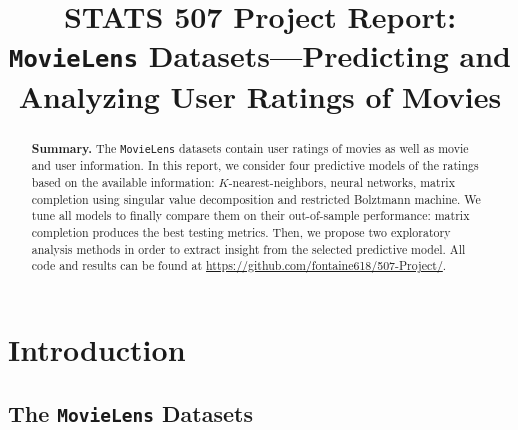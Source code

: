 \documentclass[bj, preprint]{imsart}
\begin{document}
\begin{frontmatter}

\title{{\Large STATS 507 Project Report:} \\ 
\bf \texttt{MovieLens} Datasets---Predicting and Analyzing User Ratings of Movies}


\vspace{2cm}

\begin{abstract}
\textbf{Summary.} The \texttt{MovieLens} datasets contain user ratings of movies as well as movie and user information. In this report, we consider four predictive models of the ratings based on the available information: $K$-nearest-neighbors, neural networks, matrix completion using singular value decomposition and  restricted Bolztmann machine. We tune all models to finally compare them on their out-of-sample performance: matrix completion produces the best testing metrics. Then, we propose two exploratory analysis methods in order to extract insight from the selected predictive model. All code and results can be found at \url{https://github.com/fontaine618/507-Project/}.
\end{abstract}

\end{frontmatter}


\newpage
\tableofcontents
\newpage
\section{Introduction}\label{sec:intro}
\subsection{The \texttt{MovieLens} Datasets}\label{subsec:dataset}
\end{document}
